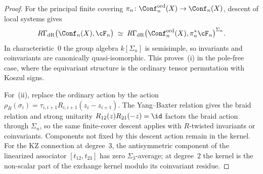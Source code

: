 \begin{proof}
For the principal finite covering
$\pi_n\colon\Conf_n^{\mathrm{ord}}(X)\to\Conf_n(X)$, descent of
local systems gives
\[
R\Gamma_{\mathrm{dR}}\bigl(\Conf_n(X),\cF_n\bigr)
\;\simeq\;
R\Gamma_{\mathrm{dR}}\bigl(\Conf_n^{\mathrm{ord}}(X),
\pi_n^*\cF_n\bigr)^{\Sigma_n}.
\]
In characteristic~$0$ the group algebra $k[\Sigma_n]$ is semisimple,
so invariants and coinvariants are canonically quasi-isomorphic. This
proves~\textup{(i)} in the pole-free case, where the equivariant
structure is the ordinary tensor permutation with Koszul signs.

For~\textup{(ii)}, replace the ordinary action by the action
$\rho_R(\sigma_i)=\tau_{i,i+1}R_{i,i+1}(z_i-z_{i+1})$. The
Yang--Baxter relation gives the braid relation and strong unitarity
$R_{12}(z)R_{21}(-z)=\id$ factors the braid action through
$\Sigma_n$, so the same finite-cover descent applies with
$R$-twisted invariants or coinvariants. Components not fixed by this
descent action remain in the kernel. For the KZ connection at
degree~$3$, the antisymmetric component of the linearized associator
$[t_{12},t_{23}]$ has zero $\Sigma_3$-average; at degree~$2$ the
kernel is the non-scalar part of the exchange kernel modulo its
coinvariant residue.
\end{proof}

